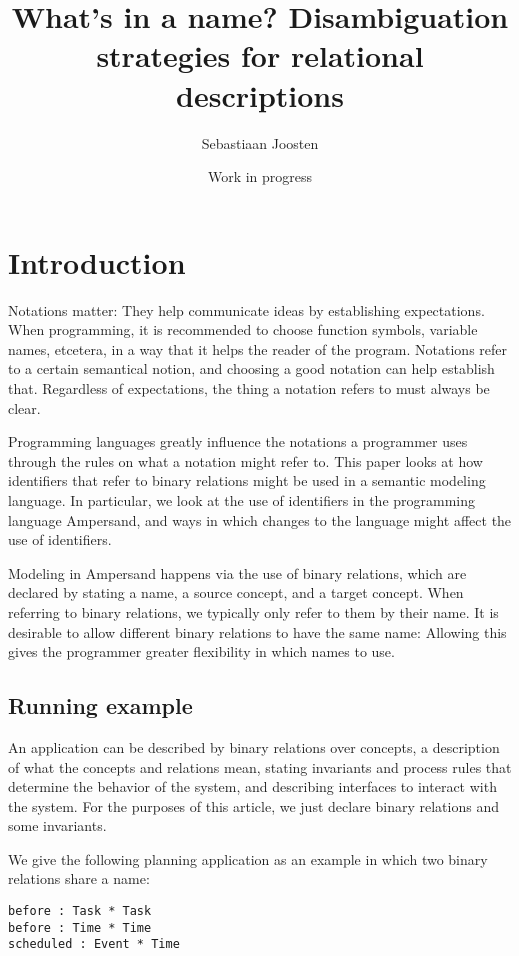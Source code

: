 \documentclass[12pt]{article}
\begin{document}
\title{What's in a name? Disambiguation strategies for relational descriptions}
\author{Sebastiaan Joosten}
\date{Work in progress}
\maketitle

\section{Introduction}
Notations matter: They help communicate ideas by establishing expectations.
When programming, it is recommended to choose function symbols, variable names, etcetera, in a way that it helps the reader of the program.
Notations refer to a certain semantical notion, and choosing a good notation can help establish that.
Regardless of expectations, the thing a notation refers to must always be clear.

Programming languages greatly influence the notations a programmer uses through the rules on what a notation might refer to.
This paper looks at how identifiers that refer to binary relations might be used in a semantic modeling language.
In particular, we look at the use of identifiers in the programming language Ampersand, and ways in which changes to the language might affect the use of identifiers.

Modeling in Ampersand happens via the use of binary relations, which are declared by stating a name, a source concept, and a target concept.
When referring to binary relations, we typically only refer to them by their name.
It is desirable to allow different binary relations to have the same name:
Allowing this gives the programmer greater flexibility in which names to use.

\subsection*{Running example}
An application can be described by binary relations over concepts, a description of what the concepts and relations mean, stating invariants and process rules that determine the behavior of the system, and describing interfaces to interact with the system.
For the purposes of this article, we just declare binary relations and some invariants.

We give the following planning application as an example in which two binary relations share a name:
\begin{verbatim}
before : Task * Task
before : Time * Time
scheduled : Event * Time
\end{verbatim}
\end{document}
